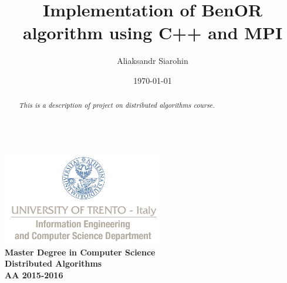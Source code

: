 \documentclass[a4paper,12pt,oneside]{article}
\title{Implementation of BenOR algorithm using C++ and MPI}
\author{Aliaksandr Siarohin}
\date{\today}
\begin{document}
\makeatletter  %
\begin{titlepage}
      \centering
      ~~~~~~~~~~~~~\\[-30mm]
      \includegraphics[keepaspectratio=true, width=7cm]{bg_eng_1r.jpg} \\[10mm]

     {
     \large \bfseries Master Degree in Computer Science\\[3mm] 
     Distributed Algorithms\\[3mm]
     AA 2015-2016
     }\\[10mm]


     \vspace{0.5cm}
     {
     \Large \bfseries \textcolor{blue}{\@title} \par
     }
     \vspace{0.5cm}
     \vspace{0.2cm}

     {\large {\@author}}
     \\ \vspace{.2cm}
     \@date

     \vspace{0.6cm}


\begin{abstract}

\textit{
  This is a description of project on distributed algorithms course.
}


\end{abstract}

\end{titlepage}
\end{document}
